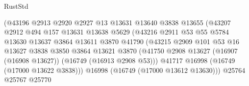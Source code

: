 \begin{lexlean}{RustStd}
\begin{coremodule}
                                      (@43196
                                        @2913
                                        @2920
                                        @2927
                                        @13
                                        @13631
                                        @13640
                                        @3838
                                        @13655
                                        (@43207
                                          @2912
                                          @494
                                          @157
                                          @13631
                                          @13638
                                          @5629
                                          (@43216
                                            @2911
                                            @53
                                            @55
                                            @5784
                                            @13630
                                            @13637
                                            @3864
                                            @13611
                                            @3870
                                            @41790
                                            (@43215
                                              @2909
                                              @101
                                              @53
                                              @16
                                              @13627
                                              @3838
                                              @3850
                                              @3864
                                              @13621
                                              @3870
                                              (@41750
                                                @2908
                                                @13627
                                                (@16907 (@16908 @13627))
                                                (@16749 (@16913 @2908 @53)))
                                              @41717
                                              @16998
                                              (@16749 (@17000 @13622 @3838)))
                                            @16998
                                            (@16749 (@17000 @13612 @13630)))
                                          @25764
                                          @25767
                                          @25770

\end{coremodule}
\end{lexlean}
